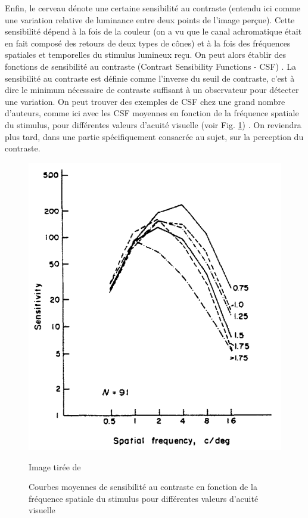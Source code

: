 	\par Enfin, le cerveau dénote une certaine sensibilité au contraste (entendu ici comme une variation relative de luminance entre deux points de l'image perçue). Cette sensibilité dépend à la fois de la couleur (on a vu que le canal achromatique était en fait composé des retours de deux types de cônes) et à la fois des fréquences spatiales et temporelles du stimulus lumineux reçu. On peut alors établir des fonctions de sensibilité au contraste (Contrast Sensibility Functions - CSF) \citep{driscoll_eyes_1978,bezzubik_modeling_2015}. La sensibilité au contraste est définie comme l'inverse du seuil de contraste, c'est à dire le minimum nécessaire de contraste suffisant à un observateur pour détecter une variation. On peut trouver des exemples de CSF chez une grand nombre d'auteurs, comme ici avec les CSF moyennes en fonction de la fréquence spatiale du stimulus, pour différentes valeurs d'acuité visuelle (voir Fig. \ref{fig:contrast_sensitivity_functions_acuity}) \citep{owsley_contrast_1983}. On reviendra plus tard, dans une partie spécifiquement consacrée au sujet, sur la perception du contraste.
	
	\begin{figure}[h]
		\centering
		\includegraphics[scale=.45]{Figures/ContrastSensitivityFunctionAcuity}
		\caption{Courbes moyennes de sensibilité au contraste en fonction de la fréquence spatiale du stimulus pour différentes valeurs d'acuité visuelle}{Image tirée de \citep{owsley_contrast_1983}}
		\label{fig:contrast_sensitivity_functions_acuity}
	\end{figure}
	
